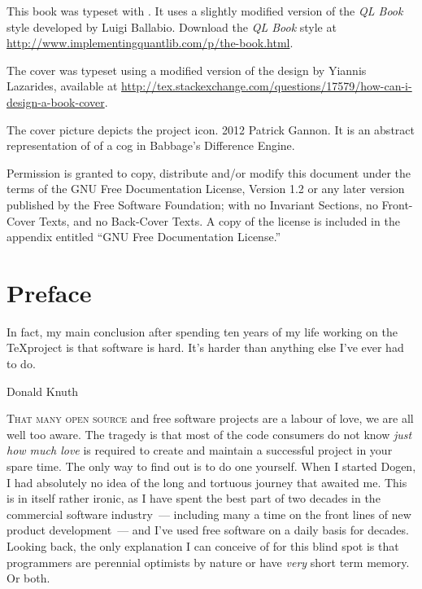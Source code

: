 \documentclass{book}
\begin{document}
This book was typeset with \LaTeXe. It uses a slightly modified
version of the \textit{QL Book} style developed by Luigi Ballabio.
Download the \textit{QL Book} style at
\url{http://www.implementingquantlib.com/p/the-book.html}.

The cover was typeset using a modified version of the design by
Yiannis Lazarides, available at
\url{http://tex.stackexchange.com/questions/17579/how-can-i-design-a-book-cover}.

The cover picture depicts the project icon. \textcopyright{} 2012
Patrick Gannon. It is an abstract representation of of a cog in
Babbage's Difference Engine.

\par Permission is granted to copy, distribute and/or modify this
document under the terms of the GNU Free Documentation License,
Version 1.2 or any later version published by the Free Software
Foundation; with no Invariant Sections, no Front-Cover Texts, and no
Back-Cover Texts. A copy of the license is included in the appendix
entitled ``GNU Free Documentation License.''

\endgroup
\clearpage

\newpage

\setcounter{tocdepth}{2}
\tableofcontents
\listoffigures
\listoftables

\chapter*{Preface}

\epigraph{In fact, my main conclusion after spending ten years of my
  life working on the \TeX project is that software is hard. It's
  harder than anything else I've ever had to do.}{Donald Knuth}

\lettrine{T}{hat many open source} and free software projects are a
labour of love, we are all well too aware. The tragedy is that most of
the code consumers do not know \emph{just how much love} is required
to create and maintain a successful project in your spare time. The
only way to find out is to do one yourself. When I started Dogen, I
had absolutely no idea of the long and tortuous journey that awaited
me. This is in itself rather ironic, as I have spent the best part of
two decades in the commercial software industry~--- including many a
time on the front lines of new product development~--- and I've used
free software on a daily basis for decades. Looking back, the only
explanation I can conceive of for this blind spot is that programmers
are perennial optimists by nature or have \emph{very} short term
memory. Or both.
\end{document}
